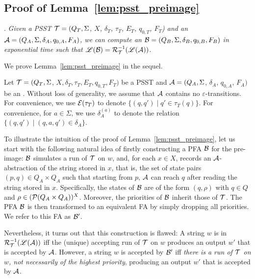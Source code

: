 \subsection{Proof of Lemma~\ref{lem:psst_preimage}}\label{app-pre-image}


\medskip

.
\emph{  Given a PSST $\mathcal{T} = (Q_T, \Sigma$, $X$, $\delta_T$, $\tau_T$, $E_T$,  $q_{0, T}$, $F_T$) and an \FA{} $\mathcal{A}
  = (Q_A, \Sigma, \delta_A, q_{0, A}, F_A)$, we can compute an \FA{} $\mathcal{B} = (Q_B,
  \Sigma, \delta_B, q_{0, B}, F_B)$ in exponential time  such that $\mathscr{L}(\mathcal{B}) = \mathcal{R}^{-1}_{\mathcal{T}}(\mathscr{L}(\mathcal{A}))$.
}

\medskip

We prove Lemma~\ref{lem:psst_preimage} in the sequel.

        Let $\mathcal{T} = (Q_T, \Sigma$, $X, \delta_T, \tau_T, E_T,  q_{0, T}, F_T)$ be a PSST  and $\mathcal{A}
        = (Q_A, \Sigma$, $\delta_A$, $q_{0, A}$, $F_A)$ be an \FA{}. Without loss of generality, we assume that $\mathcal{A}$ contains no $\varepsilon$-transitions. For convenience, we use $\mathcal{E}(\tau_T)$ to denote $\{(q, q') \mid q' \in \tau_T(q)\}$. For convenience, for $a \in \Sigma$, we use $\delta^{(a)}_A$ to denote the  relation $\{(q, q') \mid (q, a, q') \in \delta_A\}$.

        To illustrate the intuition of the proof of Lemma~\ref{lem:psst_preimage}, let us start with the following natural idea of firstly constructing a PFA $\mathcal{B}$ for the pre-image: $\mathcal{B}$ simulates a run of $\mathcal{T}$ on $w$, and, for each $x \in X$, records an $\mathcal{A}$-abstraction of the string stored in $x$, that is, the set of state pairs $(p, q) \in Q_A \times Q_A$ such that starting from $p$, $\mathcal{A}$ can reach $q$ after reading the string stored in $x$. Specifically, the states of $\mathcal{B}$ are of the form $(q, \rho)$ with $q \in Q$ and $\rho \in (\mathcal{P}(Q_A \times Q_A ))^{X}$. Moreover, the priorities of $\mathcal{B}$ inherit those of $\mathcal{T}$. The PFA $\mathcal{B}$ is then transformed to an equivalent FA by simply dropping all priorities. We refer to this FA as $\mathcal{B}'$.

        Nevertheless, it turns out that this construction is flawed: A string $w$ is in $\mathcal{R}^{-1}_{\mathcal{T}}(\mathscr{L}(\mathcal{A}))$ iff the (unique) accepting run of $\mathcal{T}$ on $w$ produces an output $w'$ that is accepted by $\mathcal{A}$. However, a string $w$ is accepted by $\mathcal{B}'$ iff \emph{there is a run of $\mathcal{T}$ on $w$, not necessarily of the highest priority}, producing an output $w'$ that is accepted by $\mathcal{A}$. 
        

